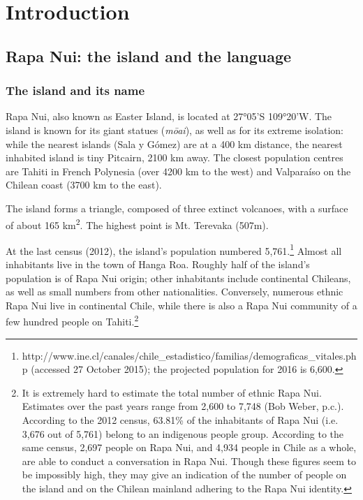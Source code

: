 \chapter[Introduction]{Introduction}\label{ch:1}
\section{Rapa Nui: the island and the language}\label{sec:1.1}
\subsection{The island and its name}\label{sec:1.1.1}

\nocite{Shopen2007-1}\nocite{Shopen2007-2}\nocite{Shopen2007-3}\nocite{Shopen1985-1}\nocite{Shopen1985-3}\nocite{Buse1963Verbal}\nocite{Buse1963Nominal}Rapa Nui, also known as Easter Island, is located at 27°05’S 109°20’W. The island is known for its giant statues (\textit{mōai}), as well as for its extreme isolation: while the nearest islands (Sala y Gómez) are at a 400 km distance, the nearest inhabited island is tiny Pitcairn, 2100 km away. The closest population centres are Tahiti in French Polynesia (over 4200 km to the west) and Valparaíso on the Chilean coast (3700 km to the east).

The island forms a triangle, composed of three extinct volcanoes, with a surface of about 165 km\textsuperscript{2}. The highest point is Mt. Terevaka (507m).

At the last census (2012), the island’s population numbered 5,761.\footnote{\label{fn:1}http://www.ine.cl/canales/chile\_estadistico/familias/demograficas\_vitales.php (accessed 27 October 2015); the projected population for 2016 is 6,600.} Almost all inhabitants live in the town of Hanga Roa. Roughly half of the island’s population is of Rapa Nui origin; other inhabitants include continental Chileans, as well as small numbers from other nationalities. Conversely, numerous ethnic Rapa Nui live in continental Chile, while there is also a Rapa Nui community of a few hundred people on Tahiti.\footnote{\label{fn:2}It is extremely hard to estimate the total number of ethnic Rapa Nui. Estimates over the past years range from 2,600 to 7,748 (Bob Weber, p.c.). According to the 2012 census, 63.81\% of the inhabitants of Rapa Nui (i.e. 3,676 out of 5,761) belong to an indigenous people group. According to the same census, 2,697 people on Rapa Nui, and 4,934 people in Chile as a whole, are able to conduct a conversation in Rapa Nui. Though these figures seem to be impossibly high, they may give an indication of the number of people on the island and on the Chilean mainland adhering to the Rapa Nui identity.} 

